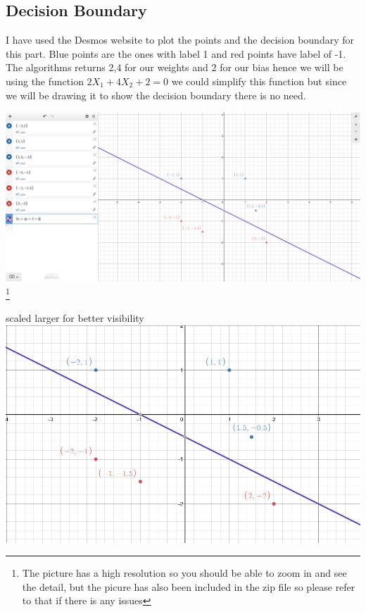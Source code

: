 \documentclass{article}
\begin{document}
	\subsection{Decision Boundary}
	I have used the Desmos website to plot the points and the decision boundary for this part. Blue points are the ones with label 1 and red points have label of -1. 
	The algorithms returns 2,4 for our weights and 2 for our bias hence we will be  using the function 
	$2X_1 + 4X_2 + 2 = 0$ we could simplify this function but since we will be drawing it to show the decision boundary there is no need.
	\begin{center}
		\includegraphics[scale=.24]{DB.png}
		\footnote{The picture has a high resolution so you should be able to zoom in and see the detail, but the picure has also been included in the zip file so please refer to that if there is any issues}
	\end{center}
	\begin{center}
	scaled larger for better visibility
	\includegraphics[scale=.65]{DB2.png}
\end{center}
\end{document}
